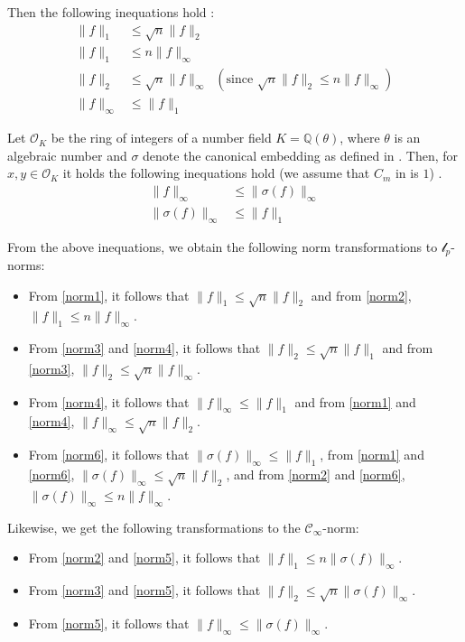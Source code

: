 \documentclass[
  a4paper,  %
  twoside,  %
  bibliography=totoc,
  headsepline,
  cleardoublepage=empty,
  parskip=half,
  draft=false
]{scrbook}
\begin{document}
Then the following inequations hold \cite{BDLOP18}:
\begin{align}
  \| f \|_1 &\leq \sqrt{n} \| f \|_2 \label{norm1}\\
  \| f \|_1 &\leq n \| f \|_\infty \label{norm2}\\
  \| f \|_2 &\leq \sqrt{n} \| f \|_\infty \;\;(\text{since }  \sqrt{n} \| f \|_2 \leq n \| f \|_\infty) \label{norm3}\\
  \| f \|_\infty& \leq \| f \|_1 \label{norm4}
\end{align}

Let $\mathcal{O}_K$ be the ring of integers of a number field $K=\mathbb{Q}(\theta)$, where $\theta$ is an algebraic number and $\sigma$ denote the canonical embedding as defined in \cite{DPSZ12}. Then, for $x, y \in \mathcal{O}_K$ it holds the following inequations hold (we assume that $C_m$ in \cite{DPSZ12} is $1$) \cite{DPSZ12}. 
\begin{align}
  \| f \|_\infty &\leq \| \sigma(f) \|_\infty \label{norm5}\\
  \| \sigma(f) \|_\infty &\leq \| f \|_1 \label{norm6}
\end{align}

From the above inequations, we obtain the following norm transformations to $\mathcal{l}_p$-norms:
\begin{itemize}
  \item From \ref{norm1}, it follows that $\| f \|_1 \leq \sqrt{n} \| f \|_2$ and from \ref{norm2}, $\| f \|_1 \leq n \| f \|_\infty$.
  \item From \ref{norm3} and \ref{norm4}, it follows that $\| f \|_2 \leq \sqrt{n}  \| f \|_1$ and from \ref{norm3}, $\| f \|_2 \leq \sqrt{n}  \| f \|_\infty$.
  \item From \ref{norm4}, it follows that $\| f \|_\infty \leq  \| f \|_1$ and from \ref{norm1} and \ref{norm4}, $\| f \|_\infty \leq \sqrt{n}  \| f \|_2$.
  \item From \ref{norm6}, it follows that $\| \sigma(f) \|_\infty \leq  \| f \|_1$, from \ref{norm1} and \ref{norm6}, $\| \sigma(f) \|_\infty \leq \sqrt{n}  \| f \|_2$, and from \ref{norm2} and \ref{norm6}, $\| \sigma(f) \|_\infty \leq n  \| f \|_\infty$.
\end{itemize}

Likewise, we get the following transformations to the $\mathcal{C}_\infty$-norm:
\begin{itemize}
  \item From \ref{norm2} and \ref{norm5}, it follows that $\| f \|_1 \leq  n \| \sigma(f) \|_\infty$.
  \item From \ref{norm3} and \ref{norm5}, it follows that $\| f \|_2 \leq  \sqrt{n} \| \sigma(f) \|_\infty$.
  \item From \ref{norm5}, it follows that $\| f \|_\infty \leq  \| \sigma(f) \|_\infty$.
\end{itemize}
\end{document}
